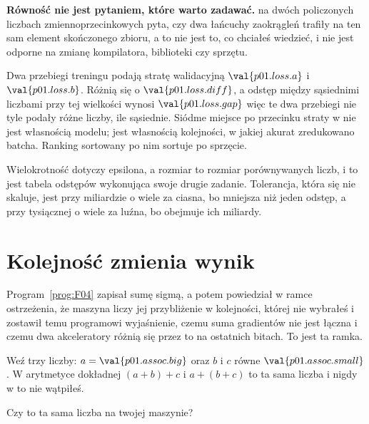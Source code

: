 \begin{fr}

\textbf{Równość nie jest pytaniem, które warto zadawać.}  na
dwóch policzonych liczbach zmiennoprzecinkowych pyta, czy dwa łańcuchy
zaokrągleń trafiły na ten sam element skończonego zbioru, a to nie jest to, co
chciałeś wiedzieć, i nie jest odporne na zmianę kompilatora, biblioteki czy
sprzętu.

\begin{aibox}
Dwa przebiegi treningu podają stratę walidacyjną $\val{p01.loss.a}$ i
$\val{p01.loss.b}$. Różnią się o $\val{p01.loss.diff}$, a odstęp między
sąsiednimi liczbami  przy tej wielkości wynosi
$\val{p01.loss.gap}$ \dash{} więc te dwa przebiegi nie tyle podały różne
liczby, ile sąsiednie. Siódme miejsce po przecinku straty w  nie
jest własnością modelu; jest własnością kolejności, w jakiej akurat zredukowano
batcha. Ranking sortowany po nim sortuje po sprzęcie.
\end{aibox}

Wielokrotność dotyczy epsilona, a rozmiar to rozmiar porównywanych liczb, i to
jest tabela odstępów wykonująca swoje drugie zadanie. Tolerancja, która się
nie skaluje, jest przy miliardzie o wiele za ciasna, bo mniejsza niż jeden
odstęp, a przy tysiącznej o wiele za luźna, bo obejmuje ich miliardy.
\end{fr}

\section{Kolejność zmienia wynik}
\label{sec:P01-order}

\begin{fr}
Program~\ref{prog:F04} zapisał sumę sigmą, a potem powiedział w ramce
ostrzeżenia, że maszyna liczy jej przybliżenie w kolejności, której nie
wybrałeś \dash{} i zostawił temu programowi wyjaśnienie, czemu suma gradientów
nie jest łączna i czemu dwa akceleratory różnią się przez to na ostatnich
bitach. To jest ta ramka.

Weź trzy liczby: $a = \val{p01.assoc.big}$ oraz $b$ i $c$ równe
$\val{p01.assoc.small}$. W arytmetyce dokładnej $(a + b) + c$ i $a + (b + c)$
to ta sama liczba i nigdy w to nie wątpiłeś.

Czy to ta sama liczba na twojej maszynie?
\nextframe
\end{fr}


